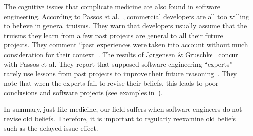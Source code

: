 \documentclass{sig-alternate}
\newcommand{\todo}[1]{\textcolor{Maroon}{TODO: #1}}
\begin{document}
The cognitive issues that complicate medicine are also found in software engineering.
According to Passos et al.~\cite{passos11}, commercial developers
are all too willing to believe in general
truisms.
They  warn that developers
usually assume that the truisms they learn from a few past
projects are general to 
all their future projects. They comment ``past experiences were taken into account without 
much consideration for their context~\cite{passos11}.  
The results of J{\o}rgensen \& Gruschke~\cite{jorgensen09} concur with Passos et al. They report that 
  supposed software engineering    ``experts'' rarely use lessons
  from past projects to improve their future reasoning~\cite{jorgensen09}. 
 They note that
when the experts
  fail to revise their beliefs, this leads to poor
 conclusions and software projects  (see examples in~\cite{jorgensen09}).

In summary, just like medicine, our field suffers when
 software engineers do  not revise old beliefs.  Therefore, it is important
 to regularly  reexamine    old beliefs such as the delayed issue effect.
  
 
 
\end{document}
